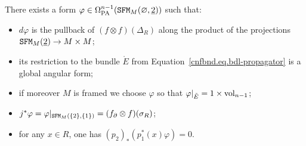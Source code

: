 \begin{proposition}
  \label{cnfbnd.prop.propagator}
  There exists a form $\varphi \in \Omega_{\mathrm{PA}}^{n-1}(\mathtt{SFM}_{M}(\varnothing,\underline{2}))$ such that:
  \begin{itemize}
  \item $d\varphi$ is the pullback of $(f \otimes f)(\Delta_{R})$ along the product of the projections $\mathtt{SFM}_{M}(\underline{2}) \to M \times M$;
  \item its restriction to the bundle $\mathring{E}$ from Equation~\eqref{cnfbnd.eq.bdl-propagator} is a global angular form;
  \item if moreover $M$ is framed we choose $\varphi$ so that $\varphi|_{\mathring{E}} = 1 \times \mathrm{vol}_{n-1}$;
  \item $j^{*} \varphi = \varphi|_{\mathtt{SFM}_{M}(\{2\},\{1\})} = (f_{\partial} \otimes f)(\sigma_{R})$;
  \item for any $x \in R$, one has $(p_{2})_{*}(p_{1}^{*}(x) \varphi) = 0$.
  \end{itemize}
\end{proposition}
